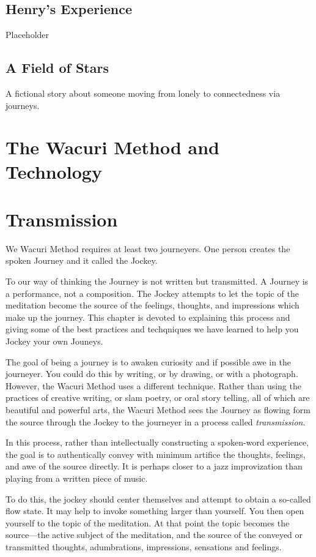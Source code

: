 \documentclass[12pt]{book}
\begin{document}
\section{Henry's Experience}

Placeholder 

\section{A Field of Stars}

A fictional story about someone moving from lonely to connectedness via journeys.
\chapter{The Wacuri Method and Technology}

\chapter{Transmission}

We Wacuri Method requires at least two journeyers. One person creates the
spoken Journey and it called the Jockey.

To our way of thinking the Journey is not written but transmitted.
A Journey is a performance, not a composition.
The Jockey attempts to let the topic of the meditation become the
source of the feelings, thoughts, and impressions which make up the journey.
This chapter is devoted to explaining this process and giving some of the
best practices and techqniques we have learned to help you Jockey your own
Jouneys.

The goal of being a journey is to awaken curiosity and if possible awe
in the journeyer. You could do this by writing, or by drawing, or
with a photograph. However, the Wacuri Method uses a different
technique. Rather than using the practices of creative writing,
or slam poetry, or oral story telling, all of which are beautiful
and powerful arts, the Wacuri Method sees the Journey as flowing
form the source through the Jockey to the journeyer in a process
called {\em transmission}.

In this process, rather than intellectually constructing a spoken-word
experience, the goal is to authentically convey with minimum artifice
the thoughts, feelings, and awe of the source directly. It is
perhaps closer to a jazz improvization than playing from a
written piece of music.

To do this, the jockey should center themselves and attempt
to obtain a so-called flow state. It may help to invoke something
larger than yourself. You then open yourself to the
topic of the meditation. At that point the topic becomes
the source---the active subject of the meditation, and
the source of the conveyed or transmitted thoughts, adumbrations,
impressions, sensations and feelings.
\end{document}
